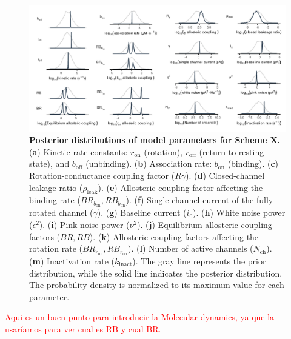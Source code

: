 \documentclass[pdflatex,sn-nature]{sn-jnl}%
\begin{document}
\begin{figure}[t]
	\centering
	\includegraphics[width=\linewidth]{Figure_2.pdf}
	\caption{\textbf{Posterior distributions of model parameters for Scheme X.}  
		(\textbf{a}) Kinetic rate constants: \(r_{\text{on}}\) (rotation), \(r_{\text{off}}\) (return to resting state), and \(b_{\text{off}}\) (unbinding).  
		(\textbf{b}) Association rate: \(b_{\text{on}}\) (binding).  
		(\textbf{c}) Rotation-conductance coupling factor (\(R\gamma\)).  
		(\textbf{d}) Closed-channel leakage ratio (\(\rho_{\text{leak}}\)).  
		(\textbf{e}) Allosteric coupling factor affecting the binding rate (\(BR_{b_{\text{on}}}, RB_{b_{\text{on}}}\)).  
		(\textbf{f}) Single-channel current of the fully rotated channel (\(\gamma\)).  
		(\textbf{g}) Baseline current (\(i_0\)).  
		(\textbf{h}) White noise power (\(\epsilon^2\)).  
		(\textbf{i}) Pink noise power (\(\nu^2\)).  
		(\textbf{j}) Equilibrium allosteric coupling factors (\(BR, RB\)).  
		(\textbf{k}) Allosteric coupling factors affecting the rotation rate (\(BR_{r_{\text{on}}}, RB_{r_{\text{on}}}\)).  
		(\textbf{l}) Number of active channels (\(N_{\text{ch}}\)).  
		(\textbf{m}) Inactivation rate (\(k_{\text{inact}}\)).  
		The gray line represents the prior distribution, while the solid line indicates the posterior distribution. The probability density is normalized to its maximum value for each parameter.
	}
	\label{fig:posterior_SchemeX}
\end{figure}

\textcolor{red}{Aqui es un buen punto para introducir  la Molecular dynamics, ya que la usaríamos para ver cual es RB y cual BR. 
}
\end{document}
